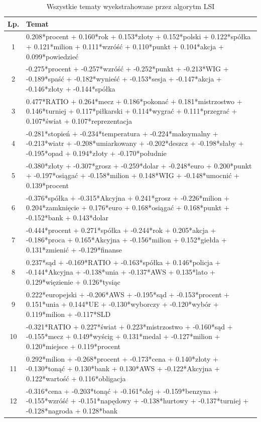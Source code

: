 \documentclass[11pt,a4paper]{article}
\begin{document}
\begin{table}[h]
\caption{Wszystkie tematy wyekstrahowane przez algorytm LSI}
\begin{tabular}{|c|>{\footnotesize}p{\linewidth}|}
\hline
Lp. & Temat \\\hline

1 & 0.208*procent + 0.160*rok + 0.153*złoty + 0.152*polski + 0.122*spółka + 0.121*milion + 0.111*wzróść + 0.110*punkt + 0.104*akcja + 0.099*powiedzieć\\\hline
2 & -0.275*procent + -0.257*wzróść + -0.252*punkt + -0.213*WIG + -0.189*spaść + -0.182*wynieść + -0.153*sesja + -0.147*akcja + -0.146*złoty + -0.144*spółka\\\hline
3 & 0.477*RATIO + 0.264*mecz + 0.186*pokonać + 0.181*mistrzostwo + 0.146*turniej + 0.117*piłkarski + 0.114*wygrać + 0.111*przegrać + 0.107*świat + 0.107*reprezentacja\\\hline
4 & -0.281*stopień + -0.234*temperatura + -0.224*maksymalny + -0.213*wiatr + -0.208*umiarkowany + -0.202*deszcz + -0.198*słaby + -0.195*opad + 0.194*złoty + -0.170*południe\\\hline
5 & -0.380*złoty + -0.307*grosz + -0.259*dolar + -0.248*euro + 0.200*punkt + -0.197*osiągać + -0.158*milion + 0.148*WIG + -0.148*umocnić + 0.139*procent\\\hline
6 & -0.376*spółka + -0.315*Akcyjna + 0.241*grosz + -0.226*milion + 0.204*zamknięcie + 0.176*euro + 0.168*osiągać + 0.168*punkt + -0.152*bank + 0.143*dolar\\\hline
7 & -0.444*procent + 0.271*spółka + -0.244*rok + 0.205*akcja + -0.186*proca + 0.165*Akcyjna + -0.156*milion + 0.152*giełda + 0.131*zmienić + -0.129*finanse\\\hline
8 & 0.237*sąd + -0.169*RATIO + -0.163*spółka + 0.146*policja + -0.144*Akcyjna + -0.138*unia + -0.137*AWS + 0.135*lato + 0.129*więzienie + 0.126*tysiąc\\\hline
9 & 0.222*europejski + -0.206*AWS + -0.195*sąd + -0.153*procent + 0.151*unia + 0.144*UE + -0.130*wyborczy + -0.120*wybór + 0.119*milion + -0.117*SLD\\\hline
10 & -0.321*RATIO + 0.227*świat + 0.223*mistrzostwo + -0.160*sąd + -0.155*mecz + 0.149*wyścig + 0.131*medal + -0.127*milion + 0.120*miejsce + 0.119*procent\\\hline
11 & 0.292*milion + -0.268*procent + -0.173*cena + 0.140*złoty + -0.130*tonąć + 0.130*bank + 0.130*AWS + -0.122*Akcyjna + 0.122*wartość + 0.116*obligacja\\\hline
12 & -0.316*cena + -0.203*tonąć + -0.161*olej + -0.159*benzyna + -0.155*wzróść + -0.151*napędowy + -0.138*hurtowy + -0.137*turniej + -0.128*nagroda + 0.128*bank\\\hline

\end{tabular}
\end{table}
\end{document}
